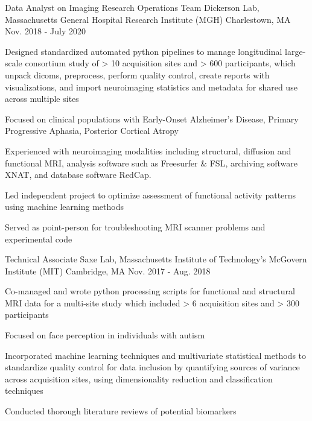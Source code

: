 \begin{cventries}
  \cventry
    {Data Analyst on Imaging Research Operations Team}
    {Dickerson Lab, Massachusetts General Hospital Research Institute (MGH)}
    {Charlestown, MA}
    {Nov. 2018 - July 2020}
    {
      \begin{cvitems}
        \item {Designed standardized automated python pipelines to manage longitudinal large-scale consortium study of > 10 acquisition sites and > 600 participants, which unpack dicoms, preprocess, perform quality control, create reports with visualizations, and import neuroimaging statistics and metadata for shared use across multiple sites}
        \item{Focused on clinical populations with Early-Onset Alzheimer's Disease, Primary Progressive Aphasia, Posterior Cortical Atropy}
       \item{Experienced with neuroimaging modalities including structural, diffusion and functional MRI, analysis software such as Freesurfer \& FSL, archiving software XNAT, and database software RedCap.}
        \item{Led independent project to optimize assessment of functional activity patterns using machine learning methods}
        \item {Served as point-person for troubleshooting MRI scanner problems and experimental code}
      \end{cvitems}
    }
  \cventry
    {Technical Associate}
    {Saxe Lab, Massachusetts Institute of Technology's McGovern Institute (MIT)}
    {Cambridge, MA}
    {Nov. 2017 - Aug. 2018}
    {
      \begin{cvitems}
        \item {Co-managed and wrote python processing scripts for functional and structural MRI data for a multi-site study which included > 6 acquisition sites and > 300 participants}
        \item{Focused on face perception in individuals with autism} 
        \item {Incorporated machine learning techniques and multivariate statistical methods to standardize quality control for data inclusion by quantifying sources of variance across acquisition sites, using dimensionality reduction and classification techniques}
        \item {Conducted thorough literature reviews of potential biomarkers}
      \end{cvitems}
    }
  \cventry

\end{cventries}
